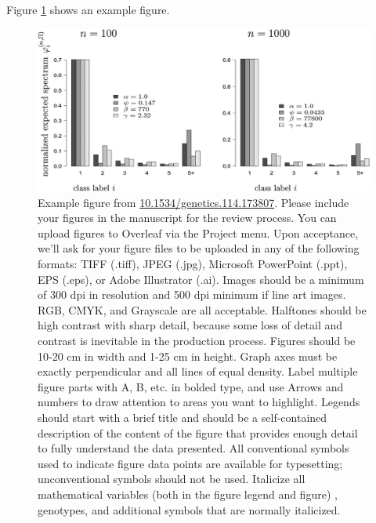 \documentclass[9pt,twocolumn,twoside]{gsajnl}
\begin{document}
Figure \ref{fig:spectrum} shows an example figure.

\begin{figure}[htbp]
\centering
\includegraphics[width=\linewidth]{example-figure.png}
\caption{Example figure from \url{10.1534/genetics.114.173807}. Please include your figures in the manuscript for the review process. You can upload figures to Overleaf via the Project menu. Upon acceptance, we'll ask for your figure files to be uploaded in any of the following formats: TIFF (.tiff), JPEG (.jpg), Microsoft PowerPoint (.ppt), EPS (.eps), or Adobe Illustrator (.ai).  Images should be a minimum of 300 dpi in resolution and 500 dpi minimum if line art images.  RGB, CMYK, and Grayscale are all acceptable. Halftones should be high contrast with sharp detail, because some loss of detail and contrast is inevitable in the production process. Figures should be 10-20 cm in width and 1-25 cm in height. Graph axes must be exactly perpendicular and all lines of equal density.
Label multiple figure parts with A, B, etc. in bolded type, and use Arrows and numbers to draw attention to areas you want to highlight. Legends should start with a brief title and should be a self-contained description of the content of the figure that provides enough detail to fully understand the data presented. All conventional symbols used to indicate figure data points are available for typesetting; unconventional symbols should not be used. Italicize all mathematical variables (both in the figure legend and figure) , genotypes, and additional symbols that are normally italicized.  
}%
\label{fig:spectrum}
\end{figure}
\end{document}
